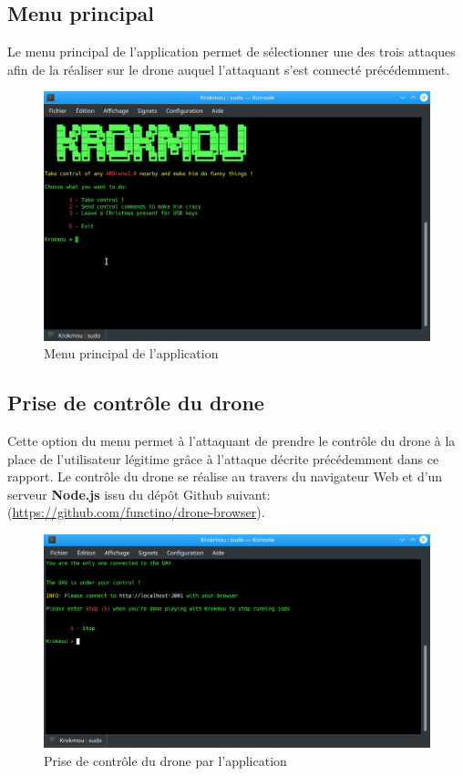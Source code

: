 \subsection{Menu principal}
Le menu principal de l'application permet de sélectionner une des trois attaques afin de la réaliser sur le drone auquel l'attaquant s'est connecté précédemment.

\begin{figure}[H]
  \centering
  \includegraphics[scale=0.3]{images/main_menu.png}
  \caption{Menu principal de l'application}
\end{figure}

\subsection{Prise de contrôle du drone}
Cette option du menu permet à l'attaquant de prendre le contrôle du drone à la place de l'utilisateur légitime grâce à l'attaque décrite précédemment dans ce rapport. Le contrôle du drone se réalise au travers du navigateur Web et d'un serveur \textbf{Node.js} issu du dépôt Github suivant: (\url{https://github.com/functino/drone-browser}).

\begin{figure}[H]
  \centering
  \includegraphics[scale=0.3]{images/taking_control.png}
  \caption{Prise de contrôle du drone par l'application}
\end{figure}

